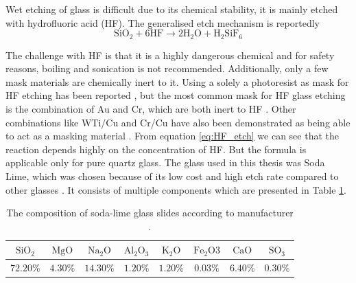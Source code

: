 \documentclass[final]{jyflluk}
\begin{document}
Wet etching of glass is difficult due to its chemical stability, it is mainly etched with hydrofluoric acid (HF). The generalised etch mechanism is reportedly \cite{etch_formula}
\begin{equation}
    \label{eq:HF_etch}
    \mathrm{SiO_2} + \mathrm{6HF} \rightarrow  \mathrm{2H_2 O} + \mathrm{H_2 Si F_6}
\end{equation}

The challenge with HF is that it is a highly dangerous chemical and for safety reasons, boiling and sonication is not recommended. Additionally, only a few mask materials are chemically inert to it.  Using a solely a photoresist as mask for HF etching has been reported \cite{lin2001fast,guanglong2012microfluidic}, but the most common mask for HF glass etching is the combination of Au and Cr, which are both inert to HF \cite{iliescu2005characterization,tay2006defect}. Other combinations like WTi/Cu and Cr/Cu have also been demonstrated as being able to act as a masking material \cite{Hgglund2013CharacterizationOM,iliescu2008wet}.
From equation \ref{eq:HF_etch} we can see that the reaction depends highly on the concentration of HF. But the formula is applicable only for pure quartz glass. The glass used in this thesis was Soda Lime, which was chosen because of its low cost and high etch rate compared to other glasses \cite{srivannavit2004design}. It consists of multiple components which are presented in Table \ref{tab:soda_lime}. 
\begin{table}[h]
    \centering
    \caption{The composition of soda-lime glass slides according to manufacturer \cite{Soda_lime_ONLINE}.}
    \label{tab:soda_lime}
    \begin{tabular}{cccccccc} \toprule
       $\mathrm{SiO_2}$  & $\mathrm{MgO}$   &  $\mathrm{Na_2 O}$ & $\mathrm{Al_2 O_3}$ &  $\mathrm{K_2 O}$ &  $\mathrm{Fe_2O3}$ &  $\mathrm{CaO}$ & $\mathrm{SO_3}$ \\ \midrule

       $72.20 \percent$  &  $4.30 \percent$ &  $14.30 \percent$  & $1.20 \percent$     &  $1.20 \percent$  & $0.03 \percent$    & $6.40 \percent$ & $0.30 \percent$\\ \bottomrule
    \end{tabular}
\end{table} 
\end{document}
